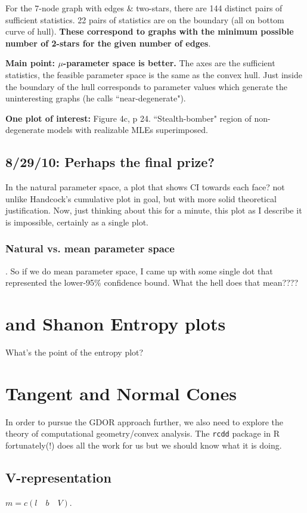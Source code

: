 \documentclass{amsbook}
\theoremstyle{definition}
\theoremstyle{remark}
\begin{document}
For the 7-node graph with edges \& two-stars, there are 144 distinct pairs of sufficient statistics.  22 pairs of statistics are on the boundary (all on bottom curve of hull).  \textbf{These correspond to graphs with the minimum possible number of 2-stars for the given number of edges}.

\textbf{Main point: $\mu$-parameter space is better.}  The axes are the sufficient statistics,  the feasible parameter space is the same as the convex hull.  Just inside the boundary of the hull corresponds to parameter values which generate the uninteresting graphs (he calls ``near-degenerate").

\textbf{One plot of interest: } Figure 4c, p 24.  ``Stealth-bomber" region of non-degenerate models with realizable MLEs superimposed.  

\subsection{8/29/10: Perhaps the final prize?}
In the natural parameter space, a plot that shows CI towards each face?  not unlike Handcock's cumulative plot in goal, but with more solid theoretical justification.  Now, just thinking about this for a minute, this plot as I describe it is impossible, certainly as a single plot.  
\subsubsection{Natural vs. mean parameter space}.  So if we do mean parameter space, I came up with some single dot that represented the lower-95\% confidence bound.  What the hell does that mean????

\section{\citet{Rinaldo:2009} and Shanon Entropy plots}  
What's the point of the entropy plot?

\newpage
\section{Tangent and Normal Cones}
In order to pursue the GDOR approach further, we also need to explore the theory of computational geometry/convex analysis.
The \texttt{rcdd} package in R \citep{rcdd} fortunately(!) does all the work for us but we should know what it is doing.

\subsection{V-representation}
$m = c(l \quad b \quad V )$.
\end{document}
